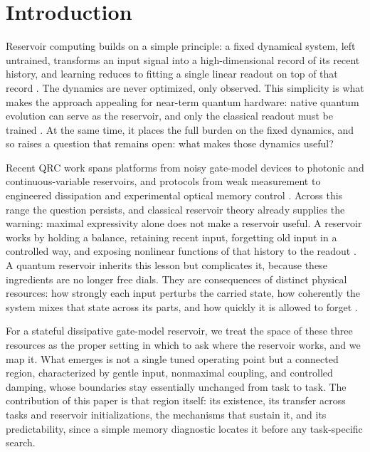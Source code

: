 \documentclass[10pt,conference]{IEEEtran}
\begin{document}
\section{Introduction}
Reservoir computing builds on a simple principle: a fixed dynamical system, left untrained, transforms an input signal into a high-dimensional record of its recent history, and learning reduces to fitting a single linear readout on top of that record \cite{maass2002,jaeger2004,tanaka2019}. The dynamics are never optimized, only observed. This simplicity is what makes the approach appealing for near-term quantum hardware: native quantum evolution can serve as the reservoir, and only the classical readout must be trained \cite{fujii2017,chen2020}. At the same time, it places the full burden on the fixed dynamics, and so raises a question that remains open: what makes those dynamics useful?

Recent QRC work spans platforms from noisy gate-model devices to photonic and continuous-variable reservoirs, and protocols from weak measurement to engineered dissipation and experimental optical memory control \cite{chen2020,nokkala2021,mujal2023,sannia2024,paparelle2026}. Across this range the question persists, and classical reservoir theory already supplies the warning: maximal expressivity alone does not make a reservoir useful. A reservoir works by holding a balance, retaining recent input, forgetting old input in a controlled way, and exposing nonlinear functions of that history to the readout \cite{dambre2012,tanaka2019}. A quantum reservoir inherits this lesson but complicates it, because these ingredients are no longer free dials. They are consequences of distinct physical resources: how strongly each input perturbs the carried state, how coherently the system mixes that state across its parts, and how quickly it is allowed to forget \cite{chen2020,sannia2024}.

For a stateful dissipative gate-model reservoir, we treat the space of these three resources as the proper setting in which to ask where the reservoir works, and we map it. What emerges is not a single tuned operating point but a connected region, characterized by gentle input, nonmaximal coupling, and controlled damping, whose boundaries stay essentially unchanged from task to task. The contribution of this paper is that region itself: its existence, its transfer across tasks and reservoir initializations, the mechanisms that sustain it, and its predictability, since a simple memory diagnostic locates it before any task-specific search.
\end{document}
